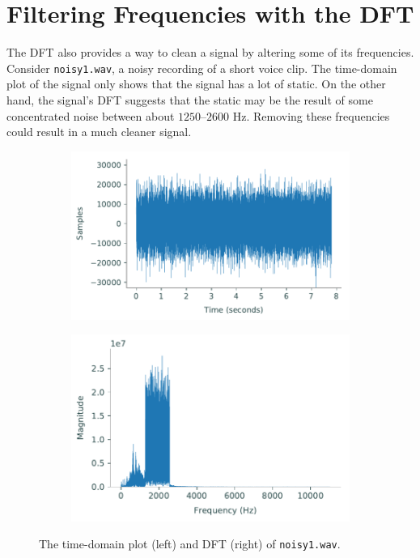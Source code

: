 \section*{Filtering Frequencies with the DFT} %

The DFT also provides a way to clean a signal by altering some of its frequencies.
Consider \texttt{noisy1.wav}, a noisy recording of a short voice clip.
The time-domain plot of the signal only shows that the signal has a lot of static.
On the other hand, the signal's DFT suggests that the static may be the result of some concentrated noise between about $1250$--$2600$ Hz.
Removing these frequencies could result in a much cleaner signal.

\begin{figure}[H]
\captionsetup[subfigure]{justification=centering}
\centering
\begin{subfigure}{.53\textwidth}
    \centering
    \includegraphics[width=\linewidth]{figures/noisy1.pdf}
\end{subfigure}%
\begin{subfigure}{.47\textwidth}
    \centering
    \includegraphics[width=\linewidth]{figures/noisy1_dft.pdf}
\end{subfigure}
\caption{The time-domain plot (left) and DFT (right) of \texttt{noisy1.wav}.}
\label{fig:fft-noisy-signal}
\end{figure}

